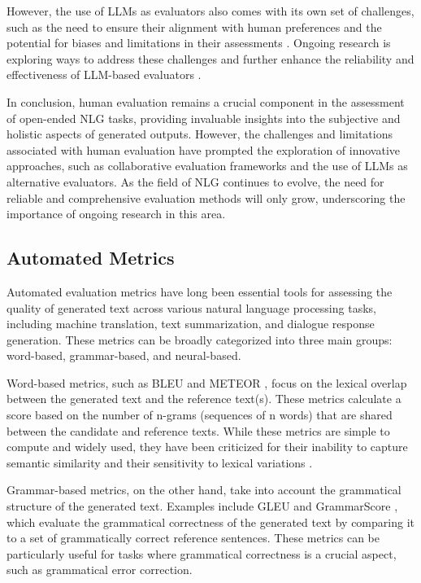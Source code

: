 \documentclass[11pt]{article}
\begin{document}
However, the use of LLMs as evaluators also comes with its own set of challenges, such as the need to ensure their alignment with human preferences and the potential for biases and limitations in their assessments \cite{ref106,ref107}. Ongoing research is exploring ways to address these challenges and further enhance the reliability and effectiveness of LLM-based evaluators \cite{ref98}.

In conclusion, human evaluation remains a crucial component in the assessment of open-ended NLG tasks, providing invaluable insights into the subjective and holistic aspects of generated outputs. However, the challenges and limitations associated with human evaluation have prompted the exploration of innovative approaches, such as collaborative evaluation frameworks and the use of LLMs as alternative evaluators. As the field of NLG continues to evolve, the need for reliable and comprehensive evaluation methods will only grow, underscoring the importance of ongoing research in this area.

\subsection{Automated Metrics}

Automated evaluation metrics have long been essential tools for assessing the quality of generated text across various natural language processing tasks, including machine translation, text summarization, and dialogue response generation. These metrics can be broadly categorized into three main groups: word-based, grammar-based, and neural-based.

Word-based metrics, such as BLEU \cite{ref108} and METEOR \cite{ref109}, focus on the lexical overlap between the generated text and the reference text(s). These metrics calculate a score based on the number of n-grams (sequences of n words) that are shared between the candidate and reference texts. While these metrics are simple to compute and widely used, they have been criticized for their inability to capture semantic similarity and their sensitivity to lexical variations \cite{ref110}.

Grammar-based metrics, on the other hand, take into account the grammatical structure of the generated text. Examples include GLEU \cite{ref111} and GrammarScore \cite{ref112}, which evaluate the grammatical correctness of the generated text by comparing it to a set of grammatically correct reference sentences. These metrics can be particularly useful for tasks where grammatical correctness is a crucial aspect, such as grammatical error correction.
\end{document}
